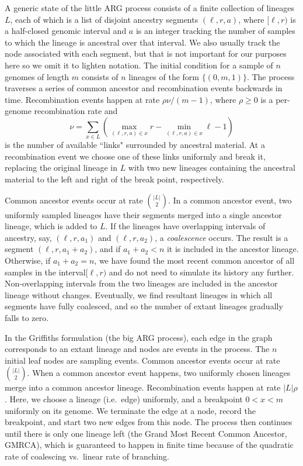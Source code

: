 \documentclass{article}
\begin{document}
A generic state of the little ARG process consists of a finite collection of lineages $L$,
each of which is a list of disjoint ancestry segments $(\ell, r, a)$, where
$[\ell, r)$ is a half-closed genomic interval and $a$ is an integer
tracking the number of samples to which the lineage is ancestral over that interval.
We also usually track the node associated with each segment, but
that is not important for our purposes here so we omit it to lighten notation.
The initial condition for a sample of $n$ genomes of length $m$ consists of $n$ lineages
of the form $\{(0, m, 1)\}$. The process traverses a series of common ancestor and
recombination events backwards in time.
Recombination events happen at rate $\rho \nu / (m - 1)$,
where $\rho \geq 0$ is a per-genome recombination rate and
 \[
 \nu = \sum_{x \in L}\left( \max_{(\ell, r, a) \in x}r
     - \min_{(\ell, r, a) \in x}\ell - 1 \right)
 \]
 is the number of available ``links" surrounded by ancestral material.
 At a recombination event we choose one of these links uniformly and break it,
 replacing the original lineage in $L$ with two new lineages containing the ancestral material
 to the left and right of the break point, respectively.

Common ancestor events occur at rate $\binom{|L|}{2}$.
In a common ancestor event, two uniformly sampled lineages have their segments
merged into a single ancestor lineage, which is added to $L$.
If the lineages have overlapping intervals of ancestry,
say, $(\ell, r, a_1)$ and $(\ell, r, a_2)$, a
\emph{coalescence} occurs. The result is a segment
$(\ell, r, a_1 + a_2)$, and if $a_1 + a_2 < n$ it is included in the
ancestor lineage. Otherwise, if $a_1 + a_2 = n$, we have found
the most recent common ancestor of all samples in the interval$[\ell, r)$
and do not need to simulate its history any further.
Non-overlapping intervals from the two lineages are included
 in the ancestor lineage without changes. Eventually,
we find resultant lineages in which all segments have fully coalesced,
and so the number of extant lineages gradually falls to zero.

In the Griffiths formulation (the big ARG process), each edge in the graph corresponds to an extant
lineage and nodes are events in the process. The $n$ initial leaf nodes are
sampling events. Common ancestor events occur at rate $\binom{|L|}{2}$.
When a common ancestor event happens, two uniformly chosen lineages
merge into a common ancestor lineage.
Recombination events happen at rate $|L| \rho$. Here, we choose a lineage (i.e.\ edge) uniformly,
and a breakpoint $0 < x < m$ uniformly on its genome. We terminate the edge at a
node, record the breakpoint, and start two new edges from this node. The process
then continues until there is only one lineage left (the Grand Most Recent
Common Ancestor, GMRCA), which is guaranteed to
happen in finite time because of the quadratic rate of coalescing vs.\ linear rate of branching.
\end{document}
